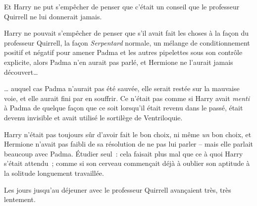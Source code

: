 Et Harry ne put s'empêcher de penser que c'était un conseil que le professeur Quirrell ne lui donnerait jamais.

Harry ne pouvait s'empêcher de penser que s'il avait fait les choses à la façon du professeur Quirrell, la façon \emph{Serpentard} normale, un mélange de conditionnement positif et négatif pour amener Padma et les autres pipelettes sous son contrôle explicite, alors Padma n'en aurait pas parlé, et Hermione ne l'aurait jamais découvert…

… auquel cas Padma n'aurait pas été sauvée, elle serait restée sur la mauvaise voie, et elle aurait fini par en souffrir. Ce n'était pas comme si Harry avait \emph{menti} à Padma de quelque façon que ce soit lorsqu'il était revenu dans le passé, était devenu invisible et avait utilisé le sortilège de Ventriloquie.

Harry n'était pas toujours sûr d'avoir fait le bon choix, ni même \emph{un} bon choix, et Hermione n'avait pas faibli de sa résolution de ne pas lui parler -- mais elle parlait beaucoup avec Padma. Étudier seul~: cela faisait plus mal que ce à quoi Harry s'était attendu~; comme si son cerveau commençait déjà à oublier son aptitude à la solitude longuement travaillée.

Les jours jusqu'au déjeuner avec le professeur Quirrell avançaient très, très lentement.
